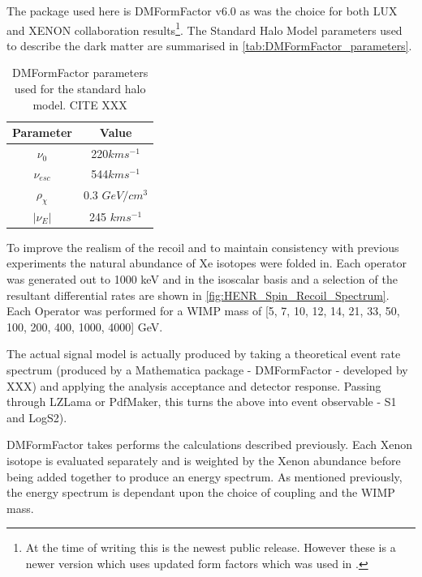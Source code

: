 \par
The package used here is DMFormFactor v6.0 as was the choice for both LUX and XENON collaboration results\footnote{At the time of writing this is the newest public release. However these is a newer version which uses updated form factors which was used in \cite{pandax_2_eft_ref}.}.
The Standard Halo Model parameters used to describe the dark matter are summarised in \autoref{tab:DMFormFactor_parameters}.
\begin{table}[]
    \centering
    \begin{tabular}{c|c}
        Parameter         & Value  \\ \hline
        $\nu_0$           & 220$km s^{-1}$ \\
        $\nu_{esc}$       & 544$km s^{-1}$ \\
        $\rho_{\chi}$     & 0.3 $GeV/cm^{3}$ \\
        $|\nu_E|$         & 245 $km s^{-1}$ 
    \end{tabular}
    \caption{DMFormFactor parameters used for the standard halo model. CITE XXX}
    \label{tab:DMFormFactor_parameters}
\end{table}
To improve the realism of the recoil and to maintain consistency with previous experiments the natural abundance of Xe isotopes were folded in.
Each operator was generated out to 1000 keV and in the isoscalar basis and a selection of the resultant differential rates are shown in \autoref{fig:HENR_Spin_Recoil_Spectrum}.
Each Operator was performed for a WIMP mass of [5, 7, 10, 12, 14, 21, 33, 50, 100, 200, 400, 1000, 4000] GeV.









\par
The actual signal model is actually produced by taking a theoretical event rate spectrum (produced by a Mathematica package - DMFormFactor - developed by XXX) and applying the analysis acceptance and detector response.
Passing through LZLama or PdfMaker, this turns the above into event observable - S1 and LogS2).
\par
DMFormFactor takes performs the calculations described previously.
Each Xenon isotope is evaluated separately and is weighted by the Xenon abundance before being added together to produce an energy spectrum.
As mentioned previously, the energy spectrum is dependant upon the choice of coupling and the WIMP mass.



